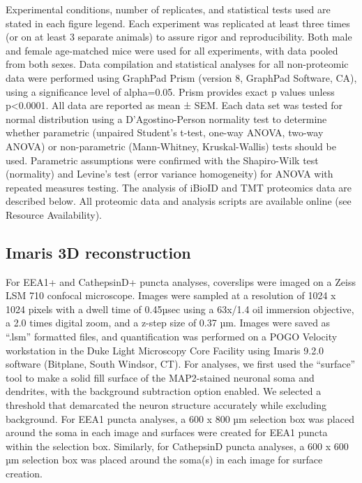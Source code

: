 
Experimental conditions, number of replicates, and statistical tests used are
stated in each figure legend. Each experiment was replicated at least three
times (or on at least 3 separate animals) to assure rigor and reproducibility.
Both male and female age-matched mice were used for all experiments, with data
pooled from both sexes. Data compilation and statistical analyses for all
non-proteomic data were performed using GraphPad Prism (version 8, GraphPad
Software, CA), using a significance level of alpha=0.05. Prism provides exact p
values unless p<0.0001. All data are reported as mean ± SEM. Each data set was
tested for normal distribution using a D'Agostino-Person normality test to
determine whether parametric (unpaired Student's t-test, one-way ANOVA, two-way
ANOVA) or non-parametric (Mann-Whitney, Kruskal-Wallis) tests should be used.
Parametric assumptions were confirmed with the Shapiro-Wilk test (normality) and
Levine's test (error variance homogeneity) for ANOVA with repeated measures
testing. The analysis of iBioID and TMT proteomics data are described below. All
proteomic data and analysis scripts are available online (see Resource
Availability).

\subsection{Imaris 3D reconstruction}

For EEA1+ and CathepsinD+ puncta analyses, coverslips were imaged on a Zeiss LSM
710 confocal microscope. Images were sampled at a resolution of 1024 x 1024
pixels with a dwell time of 0.45µsec using a 63x/1.4 oil immersion objective, a
2.0 times digital zoom, and a z-step size of 0.37 µm. Images were saved as
“.lsm” formatted files, and quantification was performed on a POGO Velocity
workstation in the Duke Light Microscopy Core Facility using Imaris 9.2.0
software (Bitplane, South Windsor, CT). For analyses, we first used the
“surface” tool to make a solid fill surface of the MAP2-stained neuronal soma
and dendrites, with the background subtraction option enabled. We selected a
threshold that demarcated the neuron structure accurately while excluding
background. For EEA1 puncta analyses, a 600 x 800 µm selection box was placed
around the soma in each image and surfaces were created for EEA1 puncta within
the selection box. Similarly, for CathepsinD puncta analyses, a 600 x 600 µm
selection box was placed around the soma(s) in each image for surface creation.

